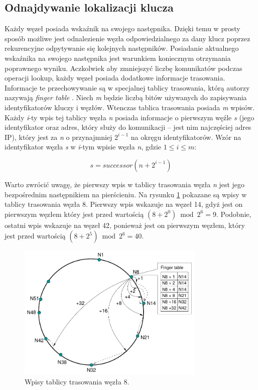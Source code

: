 \documentclass[12pt, twoside, openany]{report}
\begin{document}
\subsection{Odnajdywanie lokalizacji klucza}
\label{odnajdywanie_lokalizacji_klucza}

Każdy węzeł posiada wskaźnik na swojego następnika. Dzięki temu w prosty sposób możliwe jest odnalezienie węzła odpowiedzialnego za dany klucz poprzez rekurencyjne odpytywanie się kolejnych następników. Posiadanie aktualnego wskaźnika na swojego następnika jest warunkiem koniecznym otrzymania poprawnego wyniku. Aczkolwiek aby zmniejszyć liczbę komunikatów podczas operacji lookup, każdy węzeł posiada dodatkowe informacje trasowania. Informacje te przechowywanie są w specjalnej tablicy trasowania, którą autorzy nazywają \textit{finger table} \cite{bib:chord}. Niech \textit{m} będzie liczbą bitów używanych do zapisywania identyfikatorów kluczy i węzłów. Wtenczas tablica trasowania posiada \textit{m} wpisów. Każdy \textit{i}-ty wpis tej tablicy węzła \textit{n} posiada informacje o pierwszym węźle \textit{s} (jego identyfikator oraz adres, który służy do komunikacji -- jest nim najczęściej adres IP), który jest za \textit{n} o przynajmniej $2^{i-1}$ na okręgu identyfikatorów. Wzór na identyfikator węzła \textit{s} w \textit{i}-tym wpisie węzła \textit{n}, gdzie $1\leq i \leq m$:

\begin{equation}
\label{eq:start}
s=successor(n+2^{i-1})
\end{equation}

Warto zwrócić uwagę, że pierwszy wpis w tablicy trasowania węzła \textit{n} jest jego bezpośrednim następnikiem na pierścieniu. Na rysunku \ref{fig:finger_table} pokazane są wpisy w tablicy trasowania węzła 8. Pierwszy wpis wskazuje na węzeł 14, gdyż jest on pierwszym węzłem który jest przed wartością $(8+2^0) \bmod 2^6=9$. Podobnie, ostatni wpis wskazuje na węzeł 42, ponieważ jest on pierwszym węzłem, który jest przed wartością $(8+2^5) \bmod 2^6=40$.

\begin{figure}[H]
\centering
\includegraphics[width=0.8\textwidth,height=\textheight,keepaspectratio]{finger_table.png}
\caption{Wpisy tablicy trasowania węzła 8.}
\label{fig:finger_table}
\end{figure}
\end{document}
